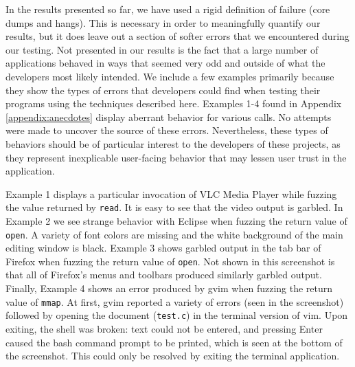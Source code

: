 In the results presented so far, we have used a rigid definition of failure (core dumps and hangs). This is necessary in order to meaningfully quantify our results, but it does leave out a section of softer errors that we encountered during our testing. Not presented in our results is the fact that a large number of applications behaved in ways that seemed very odd and outside of what the developers most likely intended. We include a few examples primarily because they show the types of errors that developers could find when testing their programs using the techniques described here. Examples 1-4 found in Appendix \ref{appendix:anecdotes} display aberrant behavior for various calls. No attempts were made to uncover the source of these errors. Nevertheless, these types of behaviors should be of particular interest to the developers of these projects, as they represent inexplicable user-facing behavior that may lessen user trust in the application.

Example 1 displays a particular invocation of VLC Media Player while fuzzing the value returned by \texttt{read}. It is easy to see that the video output is garbled. In Example 2 we see strange behavior with Eclipse when fuzzing the return value of \texttt{open}. A variety of font colors are missing and the white background of the main editing window is black. Example 3 shows garbled output in the tab bar of Firefox when fuzzing the return value of \texttt{open}. Not shown in this screenshot is that all of Firefox's menus and toolbars produced similarly garbled output. Finally, Example 4 shows an error produced by gvim when fuzzing the return value of \texttt{mmap}. At first, gvim reported a variety of errors (seen in the screenshot) followed by opening the document (\texttt{test.c}) in the terminal version of vim. Upon exiting, the shell was broken: text could not be entered, and pressing Enter caused the bash command prompt to be printed, which is seen at the bottom of the screenshot. This could only be resolved by exiting the terminal application.